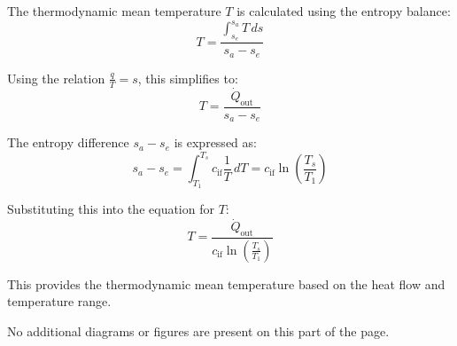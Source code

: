 The thermodynamic mean temperature \( T \) is calculated using the entropy balance:  
\[
T = \frac{\int_{s_e}^{s_a} T \, ds}{s_a - s_e}
\]  

Using the relation \( \frac{q}{T} = s \), this simplifies to:  
\[
T = \frac{\dot{Q}_{\text{out}}}{s_a - s_e}
\]  

The entropy difference \( s_a - s_e \) is expressed as:  
\[
s_a - s_e = \int_{T_1}^{T_s} c_{\text{if}} \frac{1}{T} \, dT = c_{\text{if}} \ln \left( \frac{T_s}{T_1} \right)
\]  

Substituting this into the equation for \( T \):  
\[
T = \frac{\dot{Q}_{\text{out}}}{c_{\text{if}} \ln \left( \frac{T_s}{T_1} \right)}
\]  

This provides the thermodynamic mean temperature based on the heat flow and temperature range.  

No additional diagrams or figures are present on this part of the page.